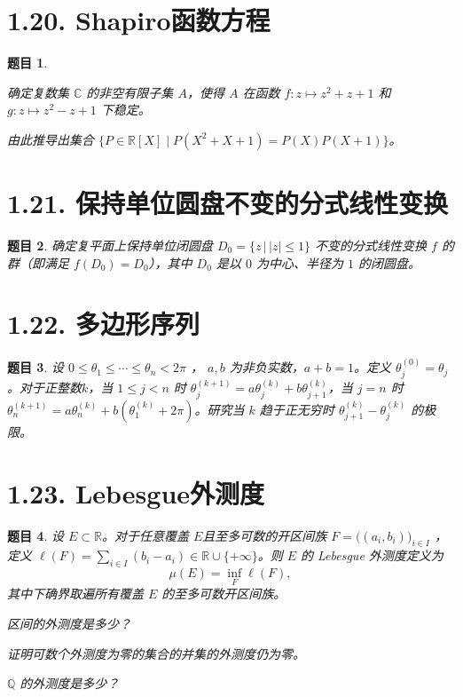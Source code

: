 \documentclass[12pt,UTF8]{ctexbook}
\theoremstyle{exercisestyle}
\newtheorem*{exercise}{题目}
\theoremstyle{solutionstyle}
\begin{document}
\section{1.20. Shapiro函数方程}
\begin{exercise}
  \begin{subquestions}
    \item 确定复数集 \(\mathbb{C}\) 的非空有限子集 \(A\)，使得 \(A\) 在函数 \(f: z \mapsto z^2 + z + 1\) 和 \(g: z \mapsto z^2 - z + 1\) 下稳定。
    \item 由此推导出集合 \(\{P \in \mathbb{R}[X] \mid P(X^2 + X + 1) = P(X)P(X + 1)\}\)。
  \end{subquestions}
\end{exercise}

\section{1.21. 保持单位圆盘不变的分式线性变换}
\begin{exercise}
确定复平面上保持单位闭圆盘 \( D_0 = \{z \, | \, |z| \leqslant 1\}\) 不变的分式线性变换 \( f \) 的群（即满足 \( f(D_0) = D_0 \)），其中 \( D_0 \) 是以 \( 0 \) 为中心、半径为 \( 1 \) 的闭圆盘。
\end{exercise}

\section{1.22. 多边形序列}
\begin{exercise}
设 \(0 \le \theta_1 \le \cdots \le \theta_n < 2\pi\) ， \(a, b\) 为非负实数，$a + b = 1$。定义 \(\theta_j^{(0)} = \theta_j\)。对于正整数$k$，当 \(1 \le j < n\) 时 \(\theta_j^{(k+1)} = a\theta_j^{(k)} + b\theta_{j+1}^{(k)}\)，当 \(j = n\) 时 \(\theta_n^{(k+1)} = a\theta_n^{(k)} + b(\theta_1^{(k)} + 2\pi)\)。研究当 \(k\) 趋于正无穷时 \(\theta_{j+1}^{(k)} - \theta_j^{(k)}\) 的极限。
\end{exercise}

\section{1.23. Lebesgue外测度}
\begin{exercise}
设 \(E \subset \mathbb{R}\)。对于任意覆盖 \(E\)且至多可数的开区间族 \(F = \bigl((a_i, b_i)\bigr)_{i \in I}\) ，定义 \(\ell(F) = \sum_{i \in I} (b_i - a_i) \in \mathbb{R} \cup \{+\infty\}\)。则 \(E\) 的 Lebesgue 外测度定义为
\[
\mu(E) = \inf_{F} \ell(F),
\]
其中下确界取遍所有覆盖 \(E\) 的至多可数开区间族。
\begin{subquestions}
\item 区间的外测度是多少？
\item 证明可数个外测度为零的集合的并集的外测度仍为零。
\item \(\mathbb{Q}\) 的外测度是多少？
\end{subquestions}
\end{exercise}
\end{document}
